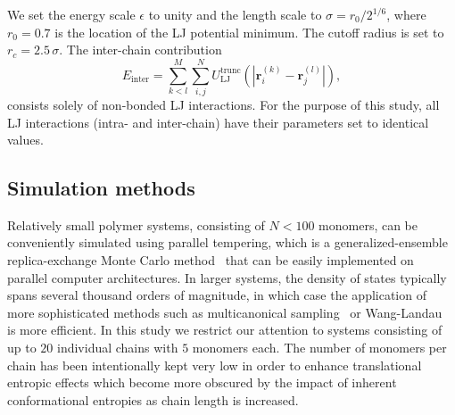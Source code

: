 \documentclass[12pt]{report}
\begin{document}
%
We set the energy scale $\epsilon$ to unity and the length scale
to $\sigma=r_0/2^{1/6}$, where $r_0 = 0.7$ is the location of
the LJ potential minimum. The cutoff radius is set to
$r_c=2.5\,\sigma$.
The inter-chain contribution
\begin{equation}
E_{\mathrm{inter}} = \sum^{M}_{k < l}
\sum^{N}_{i,j}U_{\mathrm{LJ}}^{\mathrm{trunc}}(|\textbf{r}^{(k)}_{i}
- \textbf{r}^{(l)}_{j}|),
\end{equation}
%
consists solely of non-bonded LJ interactions. For the purpose
of this study, all LJ interactions (intra- and inter-chain) have
their parameters set to identical values.
%
\subsection{Simulation methods}
%
Relatively small polymer systems, consisting of $N < 100$
monomers, can be conveniently simulated using parallel tempering, which is
a generalized-ensemble
replica-exchange Monte Carlo method~\cite{sw1,geyer1,huku1,huku2} that can
be easily implemented on parallel
computer architectures. In larger systems, 
the density of states typically spans several
thousand orders of magnitude, in which case the application of more
sophisticated methods such as multicanonical
sampling~\cite{muca1a,muca1b,muca2,muca3,muca4,Bachmann2013} or 
Wang-Landau~\cite{wl1,wl2,wl3} is more efficient. In this study we restrict
our attention to systems consisting of up to $20$ individual chains with $5$
monomers each.
The number of monomers per chain has been intentionally kept very low 
in order to enhance translational entropic effects which become more 
obscured by the impact of inherent conformational
entropies as chain length is increased.
\end{document}
